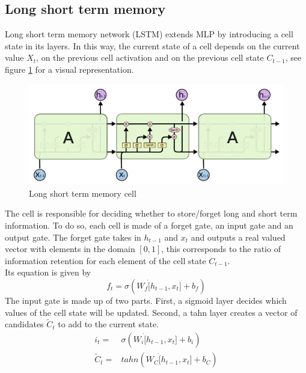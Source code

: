 \subsection{Long short term memory}

Long short term memory network (LSTM) extends MLP by introducing a cell state in its layers. In this way, the current state of a cell depends on the current value $X_t$, on the previous cell activation and on the previous cell state $C_{t-1}$, see figure \ref{fig:lstm_cell} for a visual representation. 
\begin{figure}[!h]
    \includegraphics[width=\textwidth]{images/lstm_cell.png}
    \caption{Long short term memory cell}
    \label{fig:lstm_cell}
\end{figure}
The cell is responsible for deciding whether to store/forget long and short term information. To do so, each cell is made of a forget gate, an input gate and an output gate.
The forget gate takes in $h_{t-1}$ and $x_t$ and outputs a real valued vector with elements in the domain $[0,1]$, this corresponds to the ratio of information retention for each element of the cell state $C_{t-1}$.
\\
Its equation is given by
\begin{equation}
    f_t=\sigma(W_f\dot[h_{t-1},x_t]+b_f)
\end{equation}
The input gate is made up of two parts. First, a sigmoid layer decides which values of the cell state will be updated. Second, a tahn layer creates a vector of candidates $\tilde{C}_t$ to add to the current state.
\begin{equation}
    \begin{aligned}
        i_t=&\sigma(W_i\dot[h_{t-1},x_t]+b_i)
        \\
        \tilde{C}_t=&tahn(W_C\dot[h_{t-1},x_t]+b_C)
    \end{aligned}
\end{equation}
